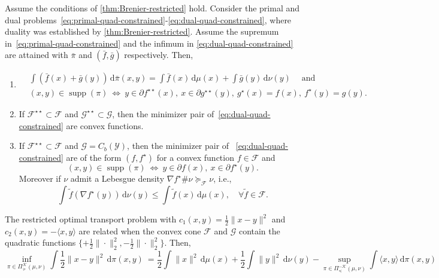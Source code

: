 \documentclass[10pt]{article}
\newcommand{\ud}{\,\mathrm{d}}
\newcommand{\op}[1]{\operatorname{#1}}
\newcommand{\norm}[1]{\|#1\|}
\renewcommand{\tilde}{\widetilde}
\newcommand{\calF}{\mathcal{F}}
\newcommand{\calG}{\mathcal{G}}
\newcommand{\calK}{\mathcal{K}}
\newcommand{\calY}{\mathcal{Y}}
\numberwithin{equation}{section}
\begin{document}
\begin{theorem}\label{thm:Brenier-restricted}
	Assume the conditions of \autoref{thm:Brenier-restricted} hold. 
	Consider the primal and dual problems~\eqref{eq:primal-quad-constrained}-\eqref{eq:dual-quad-constrained}, where duality was established by \autoref{thm:Brenier-restricted}. 
	Assume the supremum in~\eqref{eq:primal-quad-constrained} and the infimum in \eqref{eq:dual-quad-constrained} are attained with $\bar{\pi}$ and $(\bar{f},\bar{g})$ respectively. Then, 
	\begin{enumerate}
		\item 
		\begin{equation}\label{eq:optimality-pi-contrained}
		\begin{aligned}
&\int (\bar{f}(x) + \bar{g}(y))\ud \bar{\pi}(x,y) = \int \bar{f}(x)\ud \mu(x) + \int \bar{g}(y) \ud \nu(y)\quad \op{and}\\
		&(x,y) \in \op{supp}(\pi)~\Leftrightarrow~y \in \partial f^{\star\star}(x),~ x \in \partial g^{\star\star}(y),~ g^{\star}(x)=f(x),~ f^\star(y)=g(y).
		\end{aligned}
		\end{equation}
		\item If $\calF^{\star\star}\subset \calF$ and $\calG^{\star\star}\subset \calG$, then the minimizer pair of~\eqref{eq:dual-quad-constrained} are convex functions. 
		\item If $\calF^{\star\star} \subset \calF$ and $\calG = C_b(\calY)$, then the minimizer pair of ~\eqref{eq:dual-quad-constrained} are of the form $(f,f^\star)$ for a convex function $f \in \calF$ and 
		\begin{equation*}
		(x,y) \in \op{supp}(\pi)~\Leftrightarrow~y \in \partial f(x),~ x \in \partial f^{\star}(y).
		\end{equation*}
		Moreover if $\nu$ admit a Lebesgue density $\nabla f^\star \# \nu \succeq_\calF \nu$, i.e., 
		\begin{equation*}
		\int \tilde{f}(\nabla f^\star(y)) \ud \nu (y) \leq \int \tilde{f}(x)\ud \mu(x),\quad \forall \tilde{f} \in \calF.
		\end{equation*}
	\end{enumerate} 
\end{theorem}

\begin{remark}
The restricted optimal transport problem with $c_1(x,y)=\frac{1}{2}\norm{x-y}^2$ and $c_2(x,y)=-\langle x,y \rangle$ are related when the convex cone $\calF$ and $\calG$ contain the quadratic functions $\{+\frac{1}{2}\|\cdot\|_2^2,-\frac{1}{2}\|\cdot\|_2^2\}$. Then,
\begin{equation*}
\inf_{\pi \in \Pi_{\succeq}^\calK(\mu,\nu)} \int \frac{1}{2}\norm{x-y}^2 \ud \pi(x,y)~= \frac{1}{2}\int \norm{x}^2 \ud\mu(x) + \frac{1}{2} \int \norm{y}^2 \ud \nu(y) - \sup_{\pi \in \Pi_{\preceq}^{-\calK}(\mu,\nu)} \int \langle x,y \rangle \ud \pi(x,y)
\end{equation*}
\end{remark}
\end{document}
